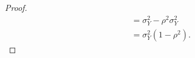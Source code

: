 \documentclass[
  coursecode={MTHE 477},
  assignmentname={Homework \homeworknumber},
  studentnumber=20053722,
  name={Bryan Hoang},
  draft,
]{
  ltxanswer%
}
\begin{document}
\begin{questions}
\begin{parts}
\begin{solution}
\begin{proof}
\begin{align*}
             &= \sigma_{Y}^{2} - \rho^{2} \sigma_{Y}^{2}                                                                                                                                                                                                                                                                                           \\
             &= \sigma_{Y}^{2} (1 - \rho^{2}).
          \end{align*}
        \end{proof}
      \end{solution}
    \end{parts}
  \end{questions}
\end{document}
